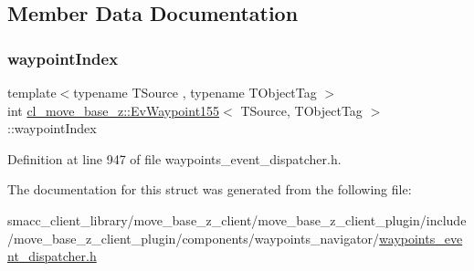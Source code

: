 \subsection{Member Data Documentation}
\mbox{\label{structcl__move__base__z_1_1EvWaypoint155_a54a6ec73df7b66c8995dca4bec3bef44}} 
\subsubsection{\texorpdfstring{waypoint\+Index}{waypointIndex}}
{\footnotesize\ttfamily template$<$typename T\+Source , typename T\+Object\+Tag $>$ \\
int \hyperlink{structcl__move__base__z_1_1EvWaypoint155}{cl\+\_\+move\+\_\+base\+\_\+z\+::\+Ev\+Waypoint155}$<$ T\+Source, T\+Object\+Tag $>$\+::waypoint\+Index}



Definition at line 947 of file waypoints\+\_\+event\+\_\+dispatcher.\+h.



The documentation for this struct was generated from the following file\+:\begin{DoxyCompactItemize}
\item 
smacc\+\_\+client\+\_\+library/move\+\_\+base\+\_\+z\+\_\+client/move\+\_\+base\+\_\+z\+\_\+client\+\_\+plugin/include/move\+\_\+base\+\_\+z\+\_\+client\+\_\+plugin/components/waypoints\+\_\+navigator/\hyperlink{waypoints__event__dispatcher_8h}{waypoints\+\_\+event\+\_\+dispatcher.\+h}\end{DoxyCompactItemize}
